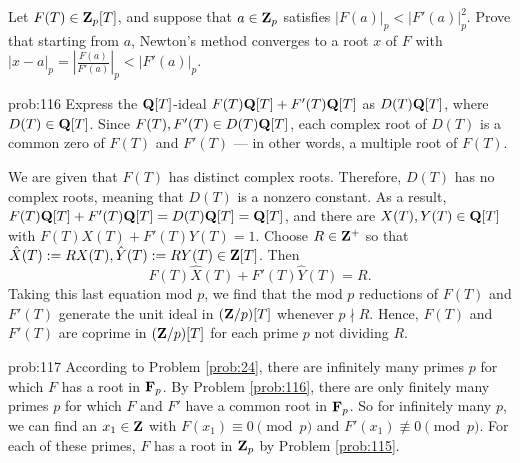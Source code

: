 \begin{challenge} Let $F(T) \in \mathbf{Z}_p[T]$, and suppose that $a\in \mathbf{Z}_p$ satisfies $|F(a)|_p < |F'(a)|_p^2$. Prove that starting from $a$, Newton's method converges to a root $x$ of $F$ with $|x-a|_p = |\frac{F(a)}{F'(a)}|_p < |F'(a)|_p$. 
\end{challenge}


\begin{sol}{prob:116} Express the $\mathbf{Q}[T]$-ideal $F(T)\mathbf{Q}[T] + F'(T)\mathbf{Q}[T]$ as  $D(T) \mathbf{Q}[T]$, where $D(T) \in \mathbf{Q}[T]$. Since $F(T), F'(T) \in D(T) \mathbf{Q}[T]$, each complex root of $D(T)$ is a common zero of $F(T)$ and $F'(T)$ --- in other words, a multiple root of $F(T)$.

We are given that $F(T)$ has distinct complex roots. Therefore, $D(T)$ has no complex roots, meaning that $D(T)$ is a nonzero constant. As a result, $F(T)\mathbf{Q}[T] + F'(T)\mathbf{Q}[T] = D(T)\mathbf{Q}[T]= \mathbf{Q}[T]$, and there are $X(T), Y(T) \in \mathbf{Q}[T]$ with $F(T) X(T) + F'(T) Y(T) = 1$. Choose $R \in \mathbf{Z}^{+}$ so that $\hat{X}(T):=R X(T), \hat{Y}(T):= R Y(T) \in \mathbf{Z}[T]$. Then 
\[ F(T) \hat{X}(T) + F'(T) \hat{Y}(T) = R.\]
Taking this last equation mod $p$, we find that the mod $p$ reductions of $F(T)$ and $F'(T)$ generate the unit ideal in $(\mathbf{Z}/p)[T]$ whenever $p\nmid R$. Hence, $F(T)$ and $F'(T)$ are coprime in $(\mathbf{Z}/p)[T]$ for each prime $p$ not dividing $R$.
\end{sol}

\begin{sol}{prob:117} According to Problem \ref{prob:24}, there are infinitely many primes $p$ for which $F$ has a root in $\mathbf{F}_p$. By Problem \ref{prob:116}, there are only finitely many primes $p$ for which $F$ and $F'$ have a common root in $\mathbf{F}_p$. So for infinitely many $p$, we can find an $x_1 \in \mathbf{Z}$ with $F(x_1)\equiv 0\pmod{p}$ and $F'(x_1)\not\equiv 0\pmod{p}$. For each of these primes, $F$ has a root in $\mathbf{Z}_p$ by Problem \ref{prob:115}.
\end{sol}

